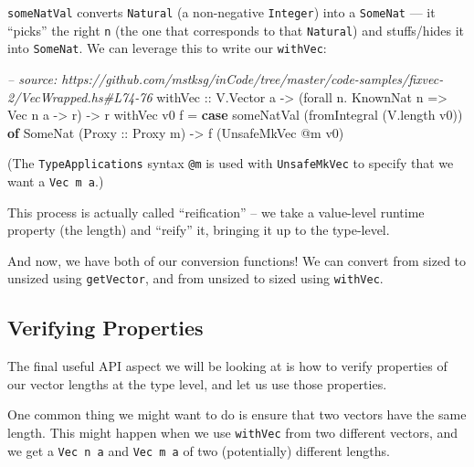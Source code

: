 \documentclass[]{article}
\newenvironment{Shaded}{}{}
\newcommand{\KeywordTok}[1]{\textcolor[rgb]{0.00,0.44,0.13}{\textbf{#1}}}
\newcommand{\DataTypeTok}[1]{\textcolor[rgb]{0.56,0.13,0.00}{#1}}
\newcommand{\CommentTok}[1]{\textcolor[rgb]{0.38,0.63,0.69}{\textit{#1}}}
\newcommand{\OtherTok}[1]{\textcolor[rgb]{0.00,0.44,0.13}{#1}}
\newcommand{\FunctionTok}[1]{\textcolor[rgb]{0.02,0.16,0.49}{#1}}
\newcommand{\NormalTok}[1]{#1}
\begin{document}
\texttt{someNatVal} converts \texttt{Natural} (a non-negative \texttt{Integer})
into a \texttt{SomeNat} --- it ``picks'' the right \texttt{n} (the one that
corresponds to that \texttt{Natural}) and stuffs/hides it into \texttt{SomeNat}.
We can leverage this to write our \texttt{withVec}:

\begin{Shaded}
\begin{Highlighting}[]
\CommentTok{-- source: https://github.com/mstksg/inCode/tree/master/code-samples/fixvec-2/VecWrapped.hs#L74-76}
\OtherTok{withVec ::} \DataTypeTok{V.Vector}\NormalTok{ a }\OtherTok{->}\NormalTok{ (forall n}\FunctionTok{.} \DataTypeTok{KnownNat}\NormalTok{ n }\OtherTok{=>} \DataTypeTok{Vec}\NormalTok{ n a }\OtherTok{->}\NormalTok{ r) }\OtherTok{->}\NormalTok{ r}
\NormalTok{withVec v0 f }\FunctionTok{=} \KeywordTok{case}\NormalTok{ someNatVal (fromIntegral (V.length v0)) }\KeywordTok{of}
    \DataTypeTok{SomeNat}\NormalTok{ (}\DataTypeTok{Proxy}\OtherTok{ ::} \DataTypeTok{Proxy}\NormalTok{ m) }\OtherTok{->}\NormalTok{ f (}\DataTypeTok{UnsafeMkVec} \FunctionTok{@}\NormalTok{m v0)}
\end{Highlighting}
\end{Shaded}

(The \texttt{TypeApplications} syntax \texttt{@m} is used with
\texttt{UnsafeMkVec} to specify that we want a \texttt{Vec\ m\ a}.)

This process is actually called ``reification'' -- we take a value-level runtime
property (the length) and ``reify'' it, bringing it up to the type-level.

And now, we have both of our conversion functions! We can convert from sized to
unsized using \texttt{getVector}, and from unsized to sized using
\texttt{withVec}.

\subsection{Verifying Properties}\label{verifying-properties}

The final useful API aspect we will be looking at is how to verify properties of
our vector lengths at the type level, and let us use those properties.

One common thing we might want to do is ensure that two vectors have the same
length. This might happen when we use \texttt{withVec} from two different
vectors, and we get a \texttt{Vec\ n\ a} and \texttt{Vec\ m\ a} of two
(potentially) different lengths.
\end{document}

